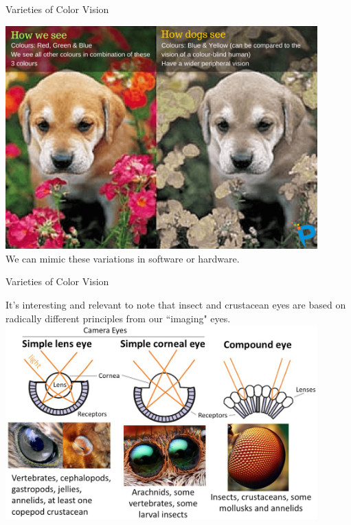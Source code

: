 \documentclass{beamer}
\begin{document}
\begin{frame}{Varieties of Color Vision}
   \begin{center}
      \includegraphics[width=0.9\textwidth]{figures/dogvison.png}
      \\ We can mimic these variations in software or hardware.
   \end{center}
\end{frame}

\begin{frame}{Varieties of Color Vision}
   \begin{center}
      It's interesting and relevant to note that insect and crustacean eyes are based on radically different principles from our ``imaging" eyes. \\
      \includegraphics[width=0.9\textwidth]{figures/insecteyes.jpg}
   \end{center}
\end{frame}
\end{document}
